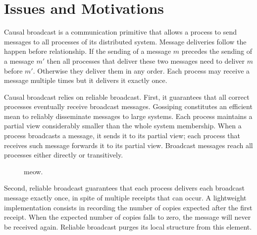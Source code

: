 
\section{Issues and Motivations}
\label{sec:motivations}

Causal broadcast is a communication primitive that allows a process to send
messages to all processes of its distributed system. Message deliveries follow
the happen before relationship. If the sending of a message $m$ precedes the
sending of a message $m'$ then all processes that deliver these two messages
need to deliver $m$ before $m'$. Otherwise they deliver them in any order. Each
process may receive a message multiple times but it delivers it exactly once.

Causal broadcast relies on reliable broadcast. First, it guarantees that all
correct processes eventually receive broadcast messages. Gossiping constitutes
an efficient mean to reliably disseminate messages to large systems. Each
process maintains a partial view considerably smaller than the whole system
membership. When a process broadcasts a message, it sends it to its partial
view; each process that receives such message forwards it to its partial
view. Broadcast messages reach all processes either directly or transitively.

\begin{figure*}
  \begin{center}
    \hspace{10pt}
    \hspace{10pt}

    \caption{meow.}
  \end{center}
\end{figure*}


Second, reliable broadcast guarantees that each process delivers each broadcast
message exactly once, in spite of multiple receipts that can occur. A
lightweight implementation consists in recording the number of copies expected
after the first receipt. When the expected number of copies falls to zero, the
message will never be received again. Reliable broadcast purges its local
structure from this element. 


